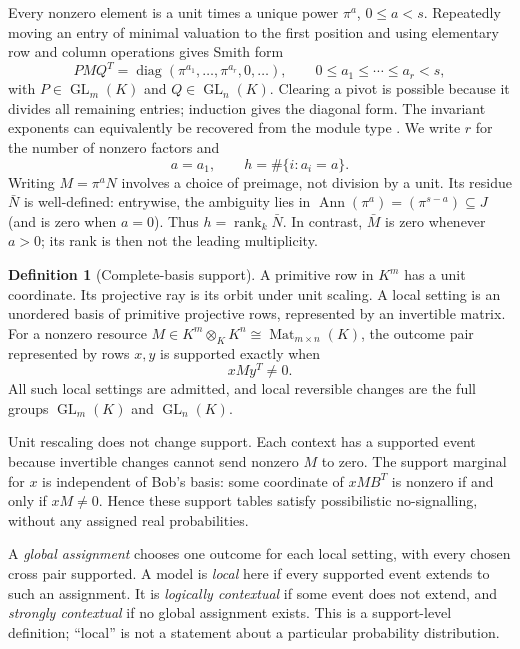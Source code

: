 \documentclass[11pt]{article}
\theoremstyle{definition}\newtheorem{definition}[theorem]{Definition}
\theoremstyle{remark}\newtheorem{remark}[theorem]{Remark}
\DeclareMathOperator{\GL}{GL}
\DeclareMathOperator{\Mat}{Mat}
\DeclareMathOperator{\rank}{rank}
\DeclareMathOperator{\diag}{diag}
\begin{document}
Every nonzero element is a unit times a unique power $\pi^a$, $0\leq a<s$. Repeatedly moving an entry of minimal valuation to the first position and using elementary row and column operations gives Smith form
\[
 PMQ^T=\diag(\pi^{a_1},\ldots,\pi^{a_r},0,\ldots),\qquad
 0\leq a_1\leq\cdots\leq a_r<s,
\]
with $P\in\GL_m(K)$ and $Q\in\GL_n(K)$. Clearing a pivot is possible because it divides all remaining entries; induction gives the diagonal form. The invariant exponents can equivalently be recovered from the module type \cite{HonoldLandjev2000,Byrne2021}. We write $r$ for the number of nonzero factors and
\[
 a=a_1,\qquad h=\#\{i:a_i=a\}.
\]
Writing $M=\pi^a N$ involves a choice of preimage, not division by a unit. Its residue $\bar N$ is well-defined: entrywise, the ambiguity lies in $\operatorname{Ann}(\pi^a)=(\pi^{s-a})\subseteq J$ (and is zero when $a=0$). Thus $h=\rank_k\bar N$. In contrast, $\bar M$ is zero whenever $a>0$; its rank is then not the leading multiplicity.

\begin{definition}[Complete-basis support]
A primitive row in $K^m$ has a unit coordinate. Its projective ray is its orbit under unit scaling. A local setting is an unordered basis of primitive projective rows, represented by an invertible matrix. For a nonzero resource $M\in K^m\otimes_K K^n\cong\Mat_{m\times n}(K)$, the outcome pair represented by rows $x,y$ is supported exactly when
\[
 xMy^T\ne0.
\]
All such local settings are admitted, and local reversible changes are the full groups $\GL_m(K)$ and $\GL_n(K)$.
\end{definition}

Unit rescaling does not change support. Each context has a supported event because invertible changes cannot send nonzero $M$ to zero. The support marginal for $x$ is independent of Bob's basis: some coordinate of $xMB^T$ is nonzero if and only if $xM\ne0$. Hence these support tables satisfy possibilistic no-signalling, without any assigned real probabilities.

A \emph{global assignment} chooses one outcome for each local setting, with every chosen cross pair supported. A model is \emph{local} here if every supported event extends to such an assignment. It is \emph{logically contextual} if some event does not extend, and \emph{strongly contextual} if no global assignment exists. This is a support-level definition; ``local'' is not a statement about a particular probability distribution.
\end{document}
